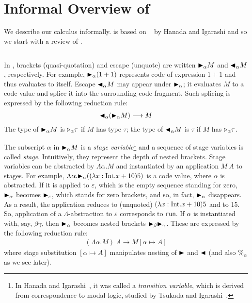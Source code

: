 
\section{Informal Overview of \LMD \label{sec:informal-overview}}

We describe our calculus \LMD informally.  \LMD is based on
\LTP~\cite{Hanada2014} by Hanada and Igarashi and so we start with a review of 
\LTP.

\subsection{\LTP}


In \LTP, brackets (quasi-quotation) and escape (unquote) are written
${\mathop{\blacktriangleright}}_\alpha M$ and ${\mathop{\blacktriangleleft}}_\alpha M$, respectively.  For example,
${\mathop{\blacktriangleright}}_\alpha (1 + 1)$ represents code of expression $1 + 1$ and thus
evaluates to itself.  Escape ${\mathop{\blacktriangleleft}}_\alpha M$ may appear under
${\mathop{\blacktriangleright}}_\alpha$; it evaluates $M$ to a code value and splice it into the
surrounding code fragment.  Such splicing is expressed by the
following reduction rule:
\begin{align*}
	{\mathop{\blacktriangleleft}}_\alpha ({\mathop{\blacktriangleright}}_\alpha M) \longrightarrow M 
\end{align*}
The type of
${\mathop{\blacktriangleright}}_\alpha M$ is ${\mathop{\triangleright}}_\alpha \tau$ if $M$ has type $\tau$; the type
of ${\mathop{\blacktriangleleft}}_\alpha M$ is $\tau$ if $M$ has ${\mathop{\triangleright}}_\alpha \tau$.

The subscript $\alpha$ in ${\mathop{\blacktriangleright}}_\alpha M$ is a \textit{stage
  variable}\footnote{%
  In Hanada and Igarashi~\cite{Hanada2014}, it was called a
  \textit{transition variable}, which is derived from correspondence
  to modal logic, studied by Tsukada and Igarashi~\cite{Tsukada}.} and
a sequence of stage variables is called \textit{stage}.  Intuitively,
they represent the depth of nested brackets.  Stage variables can be
abstracted by $\Lambda\alpha.M$ and instantiated by an application
$M\ A$ to stages.  For example,
$\Lambda\alpha.{\mathop{\blacktriangleright}}_\alpha ((\lambda x:\textrm{Int}.x+10) 5)$ is a code value,
where \(\alpha\) is abstracted.  If it is applied to \(\varepsilon\),
which is the empty sequence standing for zero, \({\mathop{\blacktriangleright}}_\alpha\) becomes
\({\mathop{\blacktriangleright}}_\varepsilon\), which stands for zero brackets, and so, in fact,
\({\mathop{\blacktriangleright}}_\alpha\) disappears.  As a result, the application reduces to
(unquoted) \((\lambda x:\textrm{Int}.x+10) 5\) and to 15.  So, application of a
\(\Lambda\)-abstraction to $\varepsilon$ corresponds to \texttt{run}.
If \(\alpha\) is instantiated with, say, \(\beta\gamma\), then
\({\mathop{\blacktriangleright}}_\alpha\) becomes nested brackets \({\mathop{\blacktriangleright}}_{\beta} {\mathop{\blacktriangleright}}_\gamma\).
These are expressed by the following reduction rule:
\begin{align*}
	(\Lambda\alpha.M)\ A \longrightarrow M[\alpha\mapsto A]
\end{align*}
where stage substitution \([\alpha \mapsto A]\) manipulates nesting of
\({\mathop{\blacktriangleright}}\) and \({\mathop{\blacktriangleleft}}\) (and also \(\%_\alpha\) as we see later).

